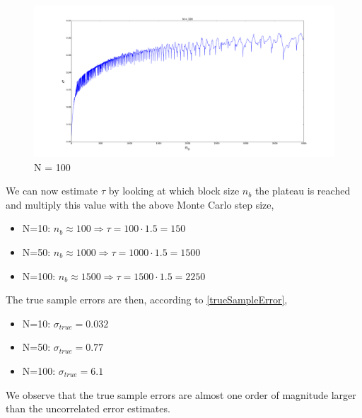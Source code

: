 \documentclass[english, a4paper]{article}
\begin{document}
\begin{figure}[H]
\begin{center}
  \includegraphics[width = 160mm]{error_100.pdf}
  \caption{N = 100}\label{fig:error100}
  \end{center}
\end{figure}
We can now estimate $\tau$ by looking at which block size $n_b$ the plateau is reached and multiply
this value with the above Monte Carlo step size, 
\begin{itemize}
 \item N=10: $n_b \approx 100 \Rightarrow \tau = 100\cdot 1.5 = 150$ 
 \item N=50: $n_b \approx 1000 \Rightarrow \tau = 1000\cdot 1.5 = 1500$
 \item N=100: $n_b \approx 1500 \Rightarrow \tau = 1500\cdot 1.5 = 2250$
\end{itemize}
The true sample errors are then, according to \eqref{trueSampleError},
\begin{itemize}
 \item N=10: $\sigma_{true} = 0.032$
 \item N=50: $\sigma_{true} = 0.77$
 \item N=100: $\sigma_{true} = 6.1$
\end{itemize}
We observe that the true sample errors are almost one order of magnitude larger than the uncorrelated
error estimates. 
\end{document}
